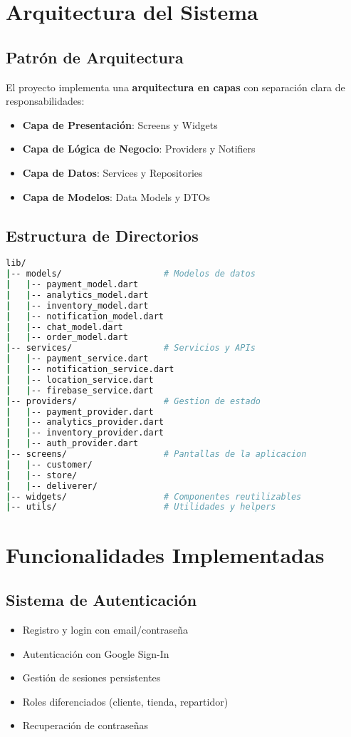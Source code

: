 \documentclass[12pt,a4paper]{article}
\begin{document}
\section{Arquitectura del Sistema}

\subsection{Patrón de Arquitectura}
El proyecto implementa una \textbf{arquitectura en capas} con separación clara de responsabilidades:

\begin{itemize}[itemsep=0.5em]
    \item \textbf{Capa de Presentación}: Screens y Widgets
    \item \textbf{Capa de Lógica de Negocio}: Providers y Notifiers
    \item \textbf{Capa de Datos}: Services y Repositories
    \item \textbf{Capa de Modelos}: Data Models y DTOs
\end{itemize}

\subsection{Estructura de Directorios}
\begin{lstlisting}[language=bash, caption=Estructura del proyecto]
lib/
|-- models/                    # Modelos de datos
|   |-- payment_model.dart
|   |-- analytics_model.dart
|   |-- inventory_model.dart
|   |-- notification_model.dart
|   |-- chat_model.dart
|   |-- order_model.dart
|-- services/                  # Servicios y APIs
|   |-- payment_service.dart
|   |-- notification_service.dart
|   |-- location_service.dart
|   |-- firebase_service.dart
|-- providers/                 # Gestion de estado
|   |-- payment_provider.dart
|   |-- analytics_provider.dart
|   |-- inventory_provider.dart
|   |-- auth_provider.dart
|-- screens/                   # Pantallas de la aplicacion
|   |-- customer/
|   |-- store/
|   |-- deliverer/
|-- widgets/                   # Componentes reutilizables
|-- utils/                     # Utilidades y helpers
\end{lstlisting}

\section{Funcionalidades Implementadas}

\subsection{Sistema de Autenticación}
\begin{itemize}[itemsep=0.5em]
    \item Registro y login con email/contraseña
    \item Autenticación con Google Sign-In
    \item Gestión de sesiones persistentes
    \item Roles diferenciados (cliente, tienda, repartidor)
    \item Recuperación de contraseñas
\end{itemize}
\end{document}
